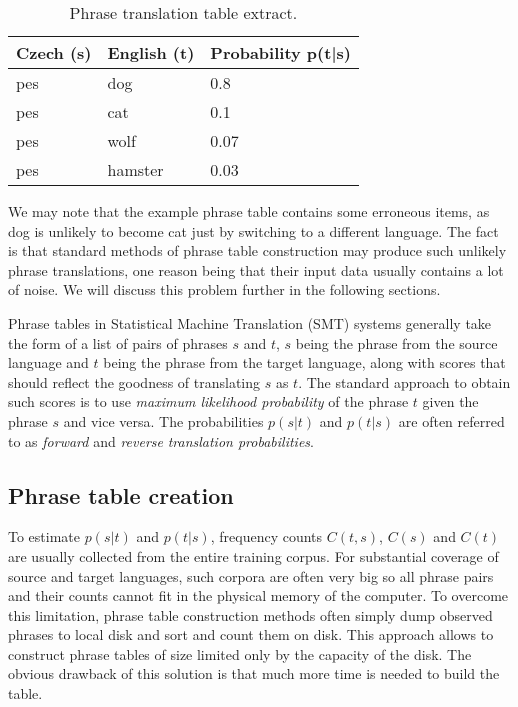 \begin{table}[h]
\centering
\begin{tabular}{ l l l}
Czech (s) & English (t) & Probability p(t|s) \\
\hline
\hline
pes & dog & 0.8 \\
pes & cat & 0.1 \\
pes & wolf & 0.07 \\
pes & hamster & 0.03 \\
\hline
\hline
\end{tabular}
\caption{\label{phrase-table-example}Phrase translation table extract.}
\end{table}

We may note that the example phrase table contains some erroneous items,
as dog is unlikely to become cat just by switching to a different language.
The fact is that standard methods of phrase table construction may produce such
unlikely phrase translations, one reason being that their input data usually
contains a lot of noise.
We will discuss this problem further in the following sections.


Phrase tables in Statistical Machine Translation (SMT) systems generally take
the form of a list of pairs of phrases $s$ and $t$, $s$ being the phrase from
the source language and $t$ being the phrase from the target language, along
with scores that should reflect the goodness of translating $s$ as $t$.
The standard approach to obtain such scores is to use \emph{maximum likelihood
probability} of the phrase $t$ given the phrase $s$ and vice versa.
The probabilities $p(s|t)$ and $p(t|s)$ are often referred to as
\emph{forward} and \emph{reverse} \emph{translation probabilities}.


\subsection{Phrase table creation}

To estimate $p(s|t)$ and $p(t|s)$, frequency counts $C(t,s)$, $C(s)$ and
$C(t)$ are usually collected from the entire training corpus.
For substantial coverage of source and target languages, such corpora are
often very big so all phrase pairs and their counts cannot fit in the
physical memory of the computer.
To overcome this limitation, phrase table construction methods often simply
dump observed phrases to local disk and sort and count them on disk.
This approach allows to construct phrase tables of size limited only by the
capacity of the disk.
The obvious drawback of this solution is that much more time is needed
to build the table.

